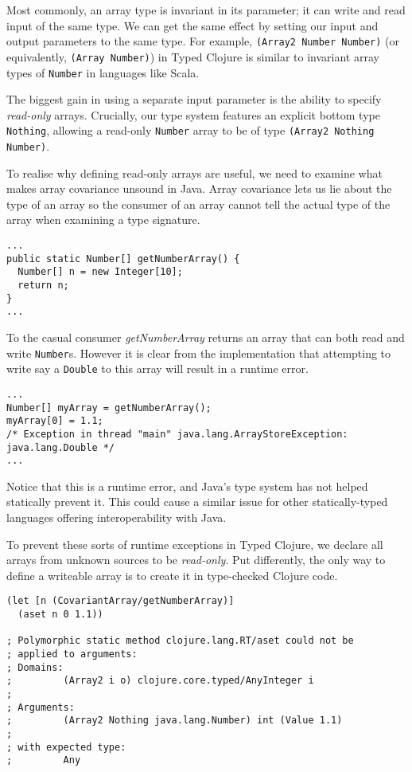 \documentclass{sigplanconf}
\begin{document}
Most commonly, an array type is invariant in its parameter; it can
write and read input of the same type.
We can get the same effect by setting our input and output
parameters to the same type. For example, \lstinline|(Array2 Number Number)|
(or equivalently, \lstinline|(Array Number)|)
in Typed Clojure is similar to invariant array types of \lstinline|Number| in languages like Scala.

The biggest gain in using a separate input parameter is the ability
to specify \emph{read-only} arrays. Crucially, our type system features an
explicit bottom type \lstinline|Nothing|, allowing a read-only \lstinline|Number| array
to be of type \lstinline|(Array2 Nothing Number)|.

To realise why defining read-only arrays are useful, we need to examine
what makes array covariance unsound in Java.
Array covariance lets us lie about the type of an array so the consumer
of an array cannot tell the actual type of the array when examining a type
signature.

\begin{verbatim}
...
public static Number[] getNumberArray() {
  Number[] n = new Integer[10];
  return n;
}
...
\end{verbatim}

To the casual consumer \emph{getNumberArray} returns an array that can both
read and write \lstinline|Number|s. However it is clear from the implementation
that attempting to write say a \lstinline|Double| to this array will result
in a runtime error.

\begin{verbatim}
...
Number[] myArray = getNumberArray();
myArray[0] = 1.1;
/* Exception in thread "main" java.lang.ArrayStoreException: java.lang.Double */
...
\end{verbatim}

Notice that this is a runtime error, and Java's type system has not helped
statically prevent it.
This could cause a similar issue for other statically-typed languages offering
interoperability with Java. 

To prevent these sorts of runtime exceptions in Typed Clojure, we declare
all arrays from unknown sources to be \emph{read-only}. Put differently,
the only way to define a writeable array is to create it in type-checked Clojure
code.

\begin{lstlisting}
(let [n (CovariantArray/getNumberArray)]
  (aset n 0 1.1))

; Polymorphic static method clojure.lang.RT/aset could not be 
; applied to arguments:
; Domains: 
;         (Array2 i o) clojure.core.typed/AnyInteger i
; 
; Arguments:
;         (Array2 Nothing java.lang.Number) int (Value 1.1)
; 
; with expected type:
;         Any
\end{lstlisting}
\end{document}
